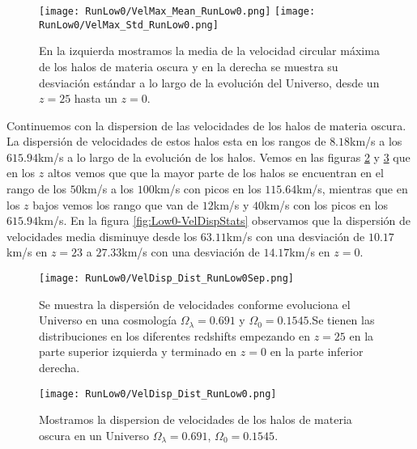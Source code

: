 \begin{figure}[H]
    \centering
    \texttt{[image: RunLow0/VelMax\_Mean\_RunLow0.png]}
    \texttt{[image: RunLow0/VelMax\_Std\_RunLow0.png]}
    \caption[Media y desviación estándar de la velocidad circular máxima]{\footnotesize En la izquierda mostramos la media de la velocidad circular máxima de los halos de materia oscura y en la derecha se muestra su desviación estándar a lo largo de la evolución del Universo, desde un $z=25$ hasta un $z=0$.}
    \label{fig:Low0-VelMaxStats}
\end{figure}

Continuemos con la dispersion de las velocidades de los halos de materia oscura. La dispersión de velocidades de estos halos esta en los rangos de $8.18$km/s a los $615.94$km/s a lo largo de la evolución de los halos. Vemos en las figuras \ref{fig:Low0-VelDispDistSep} y \ref{fig:Low0-VelDispDist} que en los $z$ altos vemos que que la mayor parte de los halos se encuentran en el rango de los $50$km/s a los $100$km/s con picos en los $115.64$km/s, mientras que en los $z$ bajos vemos los rango que van de $12$km/s y $40$km/s con los picos en los $615.94$km/s. En la figura \ref{fig:Low0-VelDispStats} observamos que la dispersión de velocidades media disminuye desde los $63.11$km/s con una desviación de $10.17$km/s en $z=23$ a $27.33$km/s con una desviación de $14.17$km/s en $z=0$.

\begin{figure}[H]
    \centering
    \texttt{[image: RunLow0/VelDisp\_Dist\_RunLow0Sep.png]}
    \caption[Dispersión de velocidades]{\footnotesize Se muestra la dispersión de velocidades conforme evoluciona el Universo en una cosmología $\Omega_\lambda = 0.691$ y $\Omega_0 = 0.1545$.Se tienen las distribuciones en los diferentes redshifts empezando en $z=25$ en la parte superior izquierda y terminado en $z=0$ en la parte inferior derecha.}
    \label{fig:Low0-VelDispDistSep}
\end{figure}

\begin{figure}[H]
    \centering
    \texttt{[image: RunLow0/VelDisp\_Dist\_RunLow0.png]}
    \caption[Distribución de la dispersión de velocidades]{\footnotesize Mostramos la dispersion de velocidades de los halos de materia oscura en un Universo $\Omega_\lambda = 0.691$, $\Omega_0 = 0.1545$.}
    \label{fig:Low0-VelDispDist}
\end{figure}

